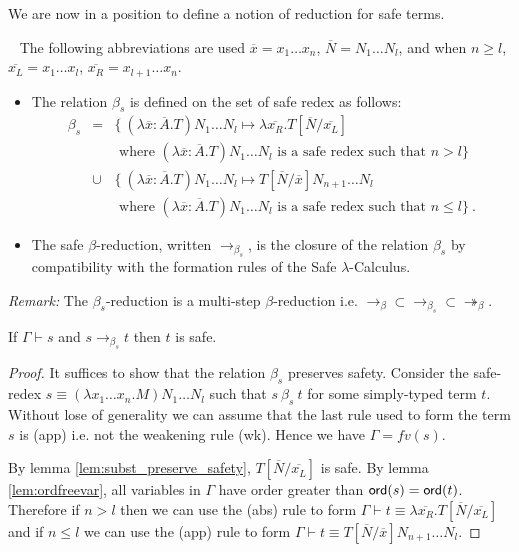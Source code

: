 \documentclass{llncs}
\newcommand\betared{\rightarrow_\beta}
\newcommand\betaredtr{\twoheadrightarrow_\beta} %
\newcommand\betasred{\rightarrow_{\beta_s}}
\newcommand\subst[2]{\left[ #1/#2 \right]}
\newcommand\ord[1]{{\sf ord}(#1)}
\begin{document}
We are now in a position to define a notion of reduction for safe terms.

\begin{definition} \
\label{dfn:safereduction} The following
abbreviations are used $\overline{x} = x_1 \ldots x_n$,
$\overline{N} = N_1 \ldots N_l$, and when $n\geq l$, $\overline{x_L}
= x_1 \ldots x_l$, $\overline{x_R} = x_{l+1} \ldots x_n$.
\begin{itemize}
\item The relation $\beta_s$ is defined on the set of safe redex as follows:
\begin{eqnarray*}
\beta_s &=&
\{  \ (\lambda \overline{x} : \overline{A} . T) N_1 \ldots N_l \mapsto \lambda \overline{x_R}. T\subst{\overline{N}}{\overline{x_L}}  \\
&& \mbox{ where $(\lambda \overline{x} : \overline{A} . T) N_1 \ldots N_l$ is a safe redex such that $n> l$}
\} \\
&\cup&
\{ \ (\lambda \overline{x} : \overline{A} . T) N_1 \ldots N_l \mapsto T\subst{\overline{N}}{\overline{x}} N_{n+1} \ldots N_l  \\
&& \mbox{ where $(\lambda \overline{x} : \overline{A} . T) N_1 \ldots N_l$ is a safe redex such that $n\leq l$}
\} \ .
\end{eqnarray*}

\item
The safe $\beta$-reduction, written $\betasred$, is the closure of
the relation $\beta_s$ by compatibility with the formation rules of
the Safe $\lambda$-Calculus.
\end{itemize}
\end{definition}

\noindent \emph{Remark:} The $\beta_s$-reduction is a multi-step $\beta$-reduction i.e. $\betared \subset \betasred \subset \betaredtr$.


\begin{lemma}
\label{lem:homoh_safered_preserve_safety}
If $\Gamma \vdash s$ and $s \betasred t$ then $t$ is safe.
\end{lemma}

\begin{proof}
It suffices to show that the relation $\beta_s$ preserves safety.
Consider the safe-redex $ s \equiv (\lambda x_1 \ldots x_n . M) N_1 \ldots N_l $ such that
$s\ \beta_s\ t$ for some simply-typed term $t$.
Without lose of generality we can assume that the last rule used to form the term $s$ is {\sf(app)} i.e. not the weakening rule
{\sf(wk)}. Hence we have $\Gamma = fv(s)$.

By lemma \ref{lem:subst_preserve_safety}, $T\subst{\overline{N}}{\overline{x_L}}$ is safe.
By lemma \ref{lem:ordfreevar}, all variables in $\Gamma$ have order greater than $\ord{s} = \ord{t}$. Therefore
if $n>l$ then we can use the {\sf(abs)} rule to form $\Gamma \vdash t \equiv \lambda \overline{x_R}. T\subst{\overline{N}}{\overline{x_L}}$
and if $n \leq l$ we can use the {\sf(app)} rule to form $\Gamma \vdash t \equiv  T\subst{\overline{N}}{\overline{x}} N_{n+1} \ldots N_l$.
\end{proof}
\end{document}
